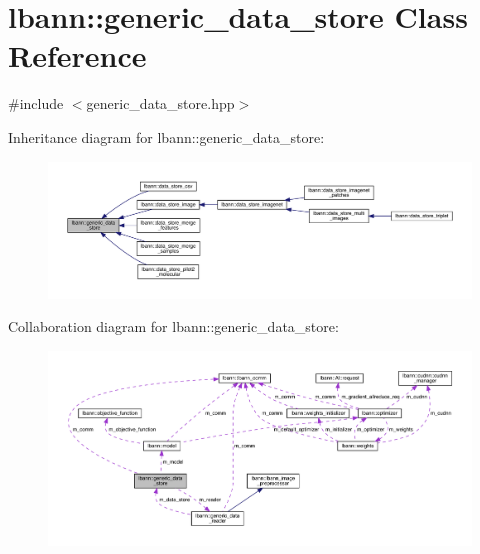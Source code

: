 \hypertarget{classlbann_1_1generic__data__store}{}\section{lbann\+:\+:generic\+\_\+data\+\_\+store Class Reference}
\label{classlbann_1_1generic__data__store}


{\ttfamily \#include $<$generic\+\_\+data\+\_\+store.\+hpp$>$}



Inheritance diagram for lbann\+:\+:generic\+\_\+data\+\_\+store\+:\nopagebreak
\begin{figure}[H]
\begin{center}
\leavevmode
\includegraphics[width=350pt]{classlbann_1_1generic__data__store__inherit__graph}
\end{center}
\end{figure}


Collaboration diagram for lbann\+:\+:generic\+\_\+data\+\_\+store\+:\nopagebreak
\begin{figure}[H]
\begin{center}
\leavevmode
\includegraphics[width=350pt]{classlbann_1_1generic__data__store__coll__graph}
\end{center}
\end{figure}
